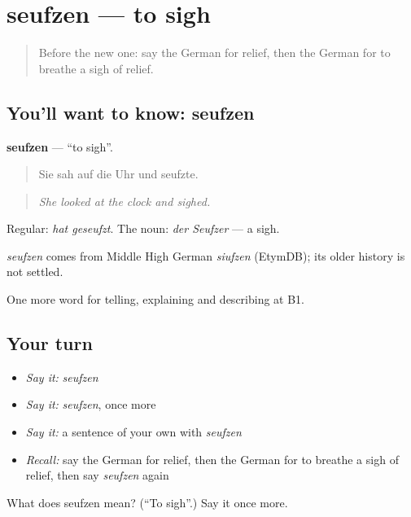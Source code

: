 \section[seufzen]{seufzen — to sigh}

\label{lesson:GE-C469-seufzen}



\begin{quote}
Before the new one: say the German for relief, then the German for to breathe a sigh of relief.
\end{quote}

\subsection*{You'll want to know: seufzen}
\textbf{seufzen} — \textquotedblleft{}to sigh\textquotedblright{}.

\begin{quote}
Sie sah auf die Uhr und seufzte.
\end{quote}

\begin{quote}
\emph{She looked at the clock and sighed.}
\end{quote}

Regular: \emph{hat geseufzt}. The noun: \emph{der Seufzer} — a sigh.

\begin{cousinweb}
\emph{seufzen} comes from Middle High German \emph{siufzen} (EtymDB); its older history is not settled.
\end{cousinweb}

\begin{grammarlens}[title={What you've built}]
One more word for telling, explaining and describing at B1.
\end{grammarlens}

\subsection*{Your turn}
\begin{itemize}
\raggedright
  \item \emph{Say it:} \emph{seufzen}
  \item \emph{Say it:} \emph{seufzen}, once more
  \item \emph{Say it:} a sentence of your own with \emph{seufzen}
  \item \emph{Recall:} say the German for relief, then the German for to breathe a sigh of relief, then say \emph{seufzen} again
\end{itemize}

\begin{tcolorbox}[breakable,colback=teal!4,colframe=teal!35!black,title={Before you move on}]
What does seufzen mean? (\textquotedblleft{}To sigh\textquotedblright{}.) Say it once more.
\end{tcolorbox}

